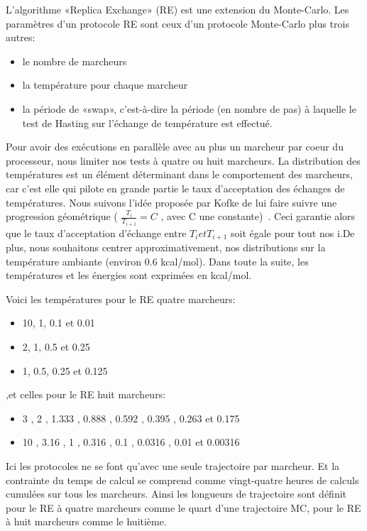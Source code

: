 L'algorithme «Replica Exchange» (RE) est une extension du Monte-Carlo. Les paramètres d'un protocole RE sont ceux d'un protocole Monte-Carlo plus trois autres:

\begin{itemize}
\item le nombre de marcheurs
\item la température pour chaque marcheur
\item la période de «swap», c'est-à-dire la période (en nombre de pas) à laquelle le test de Hasting sur l'échange de température est effectué.
\end{itemize}
Pour avoir des exécutions en parallèle avec au plus un marcheur par coeur du processeur, nous limiter nos tests à quatre ou huit marcheurs.
La distribution des températures est un élément déterminant dans le comportement des marcheurs, car c'est elle qui pilote en grande partie le taux d'acceptation des échanges de températures. Nous suivons l'idée proposée par Kofke de lui faire suivre une progression géométrique ( $ \frac{T_i}{T_{i+1}}=C $ , avec C une constante)~\citep{refRE1,refRE2,refRE3}. Ceci garantie alors que le taux d'acceptation d'échange entre $T_i et T_{i+1}$ soit égale pour tout nos i.De plus, nous souhaitons centrer approximativement, nos distributions sur la température ambiante (environ 0.6 kcal/mol). Dans toute la suite, les températures et les énergies sont exprimées en kcal/mol.

Voici les températures pour le RE quatre marcheurs:

\begin{itemize} 
\item 10, 1, 0.1 et 0.01
\item 2, 1, 0.5 et 0.25 
\item 1, 0.5, 0.25 et 0.125
\end{itemize} 

,et celles pour le RE huit marcheurs:

\begin{itemize} 
\item 3 , 2 , 1.333 , 0.888 , 0.592 , 0.395 , 0.263 et 0.175 
\item 10 , 3.16 , 1 , 0.316 , 0.1 , 0.0316 , 0.01 et 0.00316
\end{itemize} 

Ici les protocoles ne se font qu'avec une seule trajectoire par marcheur. Et la contrainte du temps de calcul se comprend comme vingt-quatre heures de calculs cumulées sur tous les marcheurs.
Ainsi les longueurs de trajectoire sont définit pour le RE à quatre marcheurs comme le quart d'une trajectoire MC, pour le RE à huit marcheurs comme le huitième.

